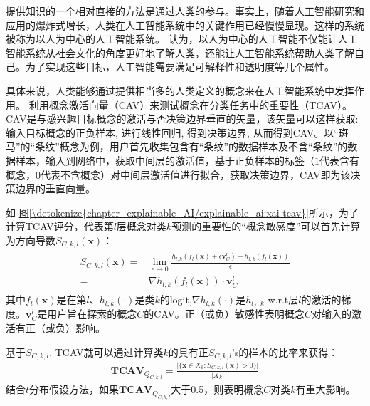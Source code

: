 \documentclass[letterpaper,10pt,english]{sphinxmanual}
\begin{document}
\sphinxAtStartPar
提供知识的一个相对直接的方法是通过人类的参与。事实上，随着人工智能研究和应用的爆炸式增长，人类在人工智能系统中的关键作用已经慢慢显现。这样的系统被称为以人为中心的人工智能系统。
认为，以人为中心的人工智能不仅能让人工智能系统从社会文化的角度更好地了解人类，还能让人工智能系统帮助人类了解自己。为了实现这些目标，人工智能需要满足可解释性和透明度等几个属性。

\sphinxAtStartPar
具体来说，人类能够通过提供相当多的人类定义的概念来在人工智能系统中发挥作用。
利用概念激活向量（CAV）来测试概念在分类任务中的重要性（TCAV）。CAV是与感兴趣目标概念的激活与否决策边界垂直的矢量，该矢量可以这样获取:
输入目标概念的正负样本, 进行线性回归, 得到决策边界,
从而得到CAV。以“斑马”的“条纹”概念为例，用户首先收集包含有“条纹”的数据样本及不含“条纹”的数据样本，输入到网络中，获取中间层的激活值，基于正负样本的标签（\(1\)代表含有概念，\(0\)代表不含概念）对中间层激活值进行拟合，获取决策边界，CAV即为该决策边界的垂直向量。

\sphinxAtStartPar
如
\hyperref[\detokenize{chapter_explainable_AI/explainable_ai:xai-tcav}]{图\ref{\detokenize{chapter_explainable_AI/explainable_ai:xai-tcav}}}所示，为了计算TCAV评分，代表第\(l\)层概念对类\(k\)预测的重要性的“概念敏感度”可以首先计算为方向导数\(S_{C,k,l}(\mathbf{x})\)：
\begin{equation}\label{equation:chapter_explainable_AI/explainable_ai:chapter_explainable_AI/explainable_ai:0}
\begin{split}\begin{split}
S_{C,k,l}(\mathbf{x}) =  &\lim_{\epsilon\rightarrow 0}\frac{h_{l,k}(f_{l}(\mathbf{x})+\epsilon \mathbf{v}^{l}_{C})-h_{l,k}(f_{l}(\mathbf{x}))}{\epsilon} \\ = &\nabla h_{l,k}(f_{l}(\mathbf{x})) \cdot \mathbf{v}^{l}_{C}
\end{split}
\label{eq:TCAV_score}\end{split}
\end{equation}
\sphinxAtStartPar
其中\(f_{l}(\mathbf{x})\)是在第\(l\)、\(h_{l,k}(\cdot)\)是类\(k\)的logit,\(\nabla h_{l,k}(\cdot)\)是\(h_{l，k}\)
w.r.t层\(l\)的激活的梯度。\(\mathbf{v}^{l}_{C}\)是用户旨在探索的概念\(C\)的CAV。正（或负）敏感性表明概念\(C\)对输入的激活有正（或负）影响。

\sphinxAtStartPar
基于\(S_{C,k,l}\),
TCAV就可以通过计算类\(k\)的具有正\(S_{C,k,l}\)’s的样本的比率来获得：
\begin{equation}\label{equation:chapter_explainable_AI/explainable_ai:chapter_explainable_AI/explainable_ai:1}
\begin{split}\textbf{TCAV}_{Q_{C,k,l}}=\frac{\vert \{\mathbf{x}\in X_{k}:S_{C,k,l}(\mathbf{x})>0\}\vert}{\vert X_{k}\vert}
\label{eq:TCAV}\end{split}
\end{equation}
\sphinxAtStartPar
结合\(t\)\sphinxhyphen{}分布假设方法，如果\(\textbf{TCAV}_{Q_{C,k,l}}\)大于0.5，则表明概念\(C\)对类\(k\)有重大影响。
\end{document}
